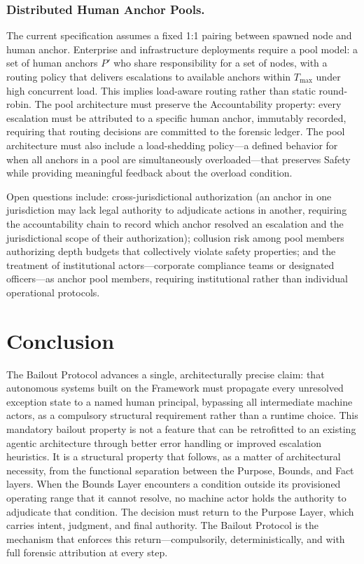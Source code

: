 \subsubsection{Distributed Human Anchor Pools.}
\label{sec:future-anchor-pools}

The current specification assumes a fixed 1:1 pairing between spawned node and human anchor. Enterprise and infrastructure deployments require a pool model: a set of human anchors $P'$ who share responsibility for a set of nodes, with a routing policy that delivers escalations to available anchors within $T_{\max}$ under high concurrent load. This implies load-aware routing rather than static round-robin. The pool architecture must preserve the Accountability property: every escalation must be attributed to a specific human anchor, immutably recorded, requiring that routing decisions are committed to the forensic ledger. The pool architecture must also include a load-shedding policy---a defined behavior for when all anchors in a pool are simultaneously overloaded---that preserves Safety while providing meaningful feedback about the overload condition.

Open questions include: cross-jurisdictional authorization (an anchor in one jurisdiction may lack legal authority to adjudicate actions in another, requiring the accountability chain to record which anchor resolved an escalation and the jurisdictional scope of their authorization); collusion risk among pool members authorizing depth budgets that collectively violate safety properties; and the treatment of institutional actors---corporate compliance teams or designated officers---as anchor pool members, requiring institutional rather than individual operational protocols.

\section{Conclusion}
\label{sec:conclusion}

The Bailout Protocol advances a single, architecturally precise claim: that autonomous systems built on the \bxthree{} Framework must propagate every unresolved exception state to a named human principal, bypassing all intermediate machine actors, as a compulsory structural requirement rather than a runtime choice. This mandatory bailout property is not a feature that can be retrofitted to an existing agentic architecture through better error handling or improved escalation heuristics. It is a structural property that follows, as a matter of architectural necessity, from the functional separation between the Purpose, Bounds, and Fact layers. When the Bounds Layer encounters a condition outside its provisioned operating range that it cannot resolve, no machine actor holds the authority to adjudicate that condition. The decision must return to the Purpose Layer, which carries intent, judgment, and final authority. The Bailout Protocol is the mechanism that enforces this return---compulsorily, deterministically, and with full forensic attribution at every step.

